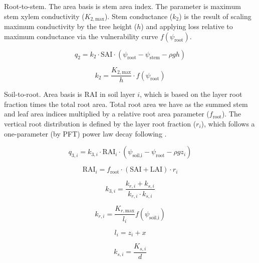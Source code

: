 \documentclass[draft,linenumbers]{agujournal}
\begin{document}
Root-to-stem. The area basis is stem area index. 
The parameter is maximum stem xylem conductivity ($K_{2,\text{max}}$).
Stem conductance ($k_2$) is the result of scaling maximum conductivity by the tree height ($h$)
and applying loss relative to maximum conductance via the vulnerability curve $f\left(\psi_{\text{root}}\right)$. 
\begin{linenomath*} \begin{equation}
q_2 = k_2 \cdot  \text{SAI}  \cdot \left( \psi_{\text{root}}-\psi_{\text{stem}}-\rho g h\right)
\end{equation} \end{linenomath*}
\begin{linenomath*} \begin{equation}
k_2 = \dfrac{K_{2,\text{max}}}{h} \cdot f\left(\psi_{\text{root}}\right)
\end{equation} \end{linenomath*}

Soil-to-root. Area basis is RAI in soil layer $i$, which is based on the layer root fraction times the
total root area. Total root area we have as the summed stem and leaf area indices multiplied by a relative
root area parameter ($f_{\text{root}}$).
The vertical root distribution is defined by the layer root fraction ($r_i$), which follows a one-parameter 
(by PFT) power law decay following \citet{jackson1996}.

\begin{linenomath*} \begin{equation}
q_{3,i} = k_{3,i} \cdot  \text{RAI}_i  \cdot \left( \psi_{\text{soil,i}}-\psi_{\text{root}}-\rho g z_i\right)
\end{equation} \end{linenomath*}
\begin{linenomath*} \begin{equation}
\text{RAI}_i=f_{\text{root}} \cdot \left( \text{SAI} + \text{LAI} \right) \cdot r_i
\end{equation} \end{linenomath*}
\begin{linenomath*} \begin{equation}
k_{3,i} = \dfrac{k_{r,i}+k_{s,i}}{k_{r,i}\cdot k_{s,i}}
\end{equation} \end{linenomath*}
\begin{linenomath*} \begin{equation}
k_{r,i} = \dfrac{K_{r,\text{max}}}{l_i} f \left(\psi_{\text{soil,i}}\right)
\end{equation} \end{linenomath*}
\begin{linenomath*} \begin{equation}
l_i = z_i + x
\end{equation} \end{linenomath*}
\begin{linenomath*} \begin{equation}
k_{s,i} = \dfrac{K_{s,i}}{d}
\end{equation} \end{linenomath*}
\end{document}
